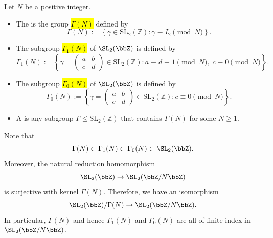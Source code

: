 \begin{definition} \label{definition:congruence_subgroup_of_SL_2_Z}
Let $N$ be a positive integer.
\begin{itemize}
    \item The  is the group \hl{$\Gamma(N)$} defined by
    $$ \Gamma(N) := \left\{ \gamma \in \mathrm{SL}_2(\mathbb{Z}) : \gamma \equiv I_2 \pmod{N} \right\}.  $$
    \item The subgroup \hl{$\Gamma_1(N)$} of $\SL_2(\bbZ)$ is defined by
    $$ \Gamma_1(N) := \left\{ \gamma = \begin{pmatrix} a & b \\ c & d \end{pmatrix} \in \mathrm{SL}_2(\mathbb{Z}) : a \equiv d \equiv 1 \pmod{N},\; c \equiv 0 \pmod{N} \right\}.  $$
    \item The subgroup \hl{$\Gamma_0(N)$} of $\SL_2(\bbZ)$ is defined by
    $$ \Gamma_0(N) := \left\{ \gamma = \begin{pmatrix} a & b \\ c & d \end{pmatrix} \in \mathrm{SL}_2(\mathbb{Z}) : c \equiv 0 \pmod{N} \right\}.  $$
    \item A  is any subgroup $\Gamma \leq \mathrm{SL}_2(\mathbb{Z})$ that contains $\Gamma(N)$ for some $N \geq 1$.
\end{itemize}
Note that
$$\Gamma(N) \subset \Gamma_1(N) \subset \Gamma_0(N) \subset \SL_2(\bbZ).$$
Moreover, the natural reduction homomorphism
$$\SL_2(\bbZ) \to \SL_2(\bbZ/N \bbZ)$$
is surjective with kernel $\Gamma(N)$. Therefore, we have an isomorphism 
$$\SL_2(\bbZ) / \Gamma(N) \to \SL_2(\bbZ/N \bbZ).$$
In particular, $\Gamma(N)$ and hence $\Gamma_1(N)$ and $\Gamma_0(N)$ are all of finite index in $\SL_2(\bbZ / N \bbZ)$.
\end{definition}